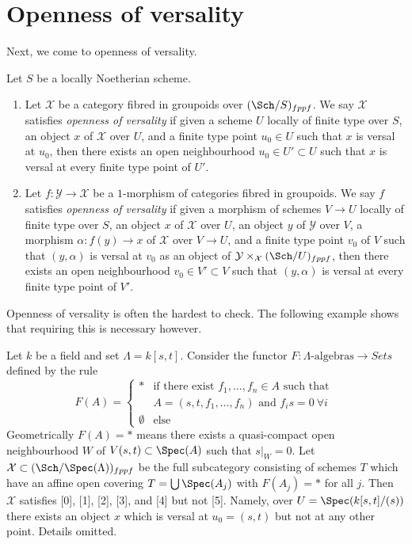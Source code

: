 \section{Openness of versality}
\label{section-openness-versality}

\noindent
Next, we come to openness of versality.

\begin{definition}
\label{definition-openness-versality}
Let $S$ be a locally Noetherian scheme.
\begin{enumerate}
\item Let $\mathcal{X}$ be a category
fibred in groupoids over $(\Sch/S)_{fppf}$. We say $\mathcal{X}$ satisfies
{\it openness of versality} if given a scheme $U$ locally of finite type
over $S$, an object $x$ of $\mathcal{X}$ over $U$, and a finite type point
$u_0 \in U$ such that $x$ is versal at $u_0$, then there exists an open
neighbourhood $u_0 \in U' \subset U$ such that $x$ is versal at every finite
type point of $U'$.
\item Let $f : \mathcal{Y} \to \mathcal{X}$ be a $1$-morphism of categories
fibred in groupoids. We say $f$ satisfies {\it openness of versality}
if given a morphism of schemes $V \to U$ locally of finite type
over $S$, an object $x$ of $\mathcal{X}$ over $U$, an object $y$
of $\mathcal{Y}$ over $V$, a morphism $\alpha : f(y) \to x$ of $\mathcal{X}$
over $V \to U$, and a finite type point $v_0$ of $V$ such that
$(y, \alpha)$ is versal at $v_0$ as an object of
$\mathcal{Y} \times_{\mathcal{X}} (\Sch/U)_{fppf}$,
then there exists an open neighbourhood $v_0 \in V' \subset V$
such that $(y, \alpha)$ is versal at every finite type point of $V'$.
\end{enumerate}
\end{definition}

\noindent
Openness of versality is often the hardest to check. The following example
shows that requiring this is necessary however.

\begin{example}
\label{example-versality}
Let $k$ be a field and set $\Lambda = k[s, t]$. Consider the functor
$F : \Lambda\text{-algebras} \longrightarrow \textit{Sets}$
defined by the rule
$$
F(A) =
\left\{
\begin{matrix}
* & \text{if there exist }f_1, \ldots, f_n \in A\text{ such that } \\
  & A = (s, t, f_1, \ldots, f_n)\text{ and } f_i s = 0\ \forall i \\
\emptyset & \text{else}
\end{matrix}
\right.
$$
Geometrically $F(A) = *$ means there exists a quasi-compact open neighbourhood
$W$ of $V(s, t) \subset \Spec(A)$ such that $s|_W = 0$.
Let $\mathcal{X} \subset (\Sch/\Spec(\Lambda))_{fppf}$ be the full
subcategory consisting of schemes $T$ which have an affine open covering
$T = \bigcup \Spec(A_j)$ with $F(A_j) = *$ for all $j$. Then $\mathcal{X}$
satisfies [0], [1], [2], [3], and [4] but not [5]. Namely, over
$U = \Spec(k[s, t]/(s))$
there exists an object $x$ which is versal at $u_0 = (s, t)$ but not
at any other point. Details omitted.
\end{example}

